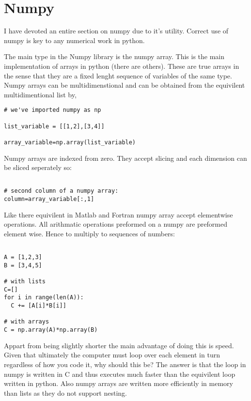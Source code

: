 \documentclass[11pt,a4paper]{article}
\begin{document}
\section{Numpy}

I have devoted an entire section on numpy due to it's utility. Correct use of numpy is key to any numerical work in python.

The main type in the Numpy library is the numpy array. This is the main implementation of arrays in python (there are others). These are true arrays in the sense that they are a fixed lenght sequence of variables of the same type. Numpy arrays can be multidimenstional and can be obtained from the equivilent multidimentional list by,

\begin{verbatim}
# we've imported numpy as np

list_variable = [[1,2],[3,4]]

array_variable=np.array(list_variable)

\end{verbatim}

Numpy arrays are indexed from zero. They accept slicing and each dimension can be sliced seperately so:

\begin{verbatim}

# second column of a numpy array:
column=array_variable[:,1]

\end{verbatim}

Like there equivilent in Matlab and Fortran numpy array accept elementwise operations. All arithmatic operations preformed on a numpy are preformed element wise. Hence to multiply to sequences of numbers:

\begin{verbatim}

A = [1,2,3]
B = [3,4,5]

# with lists
C=[]
for i in range(len(A)):
  C += [A[i]*B[i]]

# with arrays
C = np.array(A)*np.array(B)

\end{verbatim}

Appart from being slightly shorter the main advantage of doing this is speed. Given that ultimately the computer must loop over each element in turn regardless of how you code it, why should this be? The answer is that the loop in numpy is written in C and thus executes much faster than the equivilent loop written in python. Also numpy arrays are written more efficiently in memory than lists as they do not support nesting.
\end{document}
